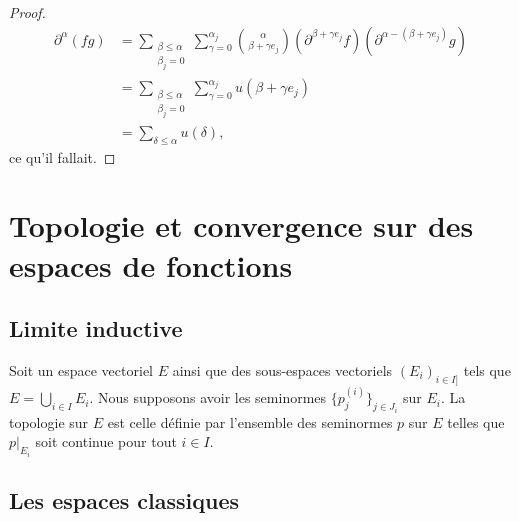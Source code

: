 \begin{proof}
\begin{subequations}
		\begin{align}
			\partial^{\alpha}(fg) & =\sum_{\substack{\beta\leq \alpha    \\\beta_j=0}}\sum_{\gamma=0}^{\alpha_j}\binom{ \alpha }{ \beta+\gamma e_j }(\partial^{\beta+\gamma e_j}f)(\partial^{\alpha-(\beta+\gamma e_j)}g)\\
			                      & =\sum_{\substack{\beta\leq \alpha    \\\beta_j=0}}\sum_{\gamma=0}^{\alpha_j}u(\beta+\gamma e_j)\\
			                      & = \sum_{\delta\leq \alpha}u(\delta),
		\end{align}
	\end{subequations}
	ce qu'il fallait.
\end{proof}

\section{Topologie et convergence sur des espaces de fonctions}

\subsection{Limite inductive}

\begin{definition}		\label{DEFooFCLUooSGJIKJ}
	Soit un espace vectoriel \( E\) ainsi que des sous-espaces vectoriels \( (E_i)_{i\in I]} \) tels que \( E=\bigcup_{i\in I}E_i\). Nous supposons avoir les seminormes \( \{ p_j^{(i)} \}_{j\in J_i}\) sur \( E_i\). La topologie  sur \( E\) est celle définie par l'ensemble des seminormes \( p\) sur \( E\) telles que \( p|_{E_i}\) soit continue pour tout \( i\in I\).
\end{definition}

\subsection{Les espaces classiques}


